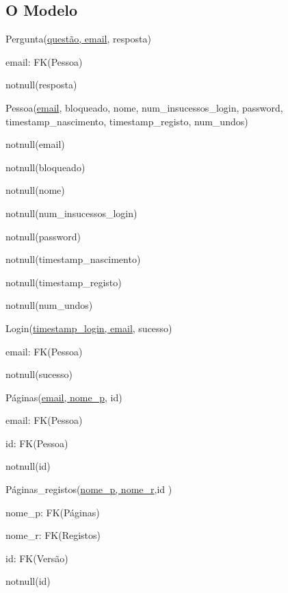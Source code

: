 \documentclass[11pt,a4paper]{article}
\begin{document}
\subsection{O Modelo}

\begin{description}[noitemsep]
	\item Pergunta(\underline{quest\~ao, email}, resposta)
	\item email: FK(Pessoa)
	\item notnull(resposta)
\end{description}

\begin{description}[noitemsep]
	\item Pessoa(\underline{email}, bloqueado, nome, num\_insucessos\_login, password, timestamp\_nascimento, timestamp\_registo, num\_undos)
	\item notnull(email)
	\item notnull(bloqueado)
	\item notnull(nome)
	\item notnull(num\_insucessos\_login)
	\item notnull(password)
	\item notnull(timestamp\_nascimento)
	\item notnull(timestamp\_registo)
	\item notnull(num\_undos)
\end{description}

\begin{description}[noitemsep]
	\item Login(\underline{timestamp\_login, email}, sucesso)
	\item email: FK(Pessoa)
	\item notnull(sucesso)
\end{description}

\begin{description}[noitemsep]
	\item P\'{a}ginas(\underline{email, nome\_p}, id)
	\item email: FK(Pessoa)
	\item id: FK(Pessoa)
	\item notnull(id)
\end{description}

\begin{description}[noitemsep]
	\item P\'{a}ginas\_registos(\underline{nome\_p, nome\_r},id )
	\item nome\_p: FK(P\'{a}ginas)
	\item nome\_r: FK(Registos)
	\item id: FK(Vers\~{a}o)
	\item notnull(id)
\end{description}
\end{document}
